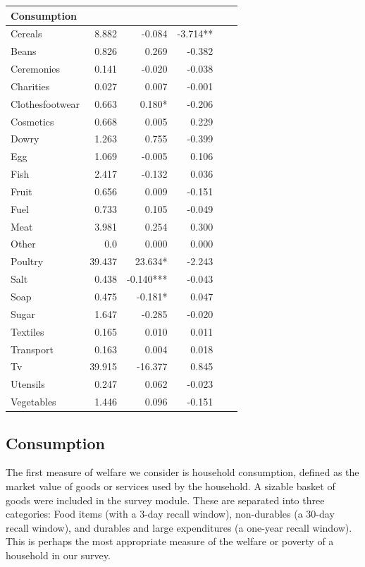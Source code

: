 \documentclass[12pt,article]{article}
\begin{document}
\begin{longtable}{lrrrrr}
\hline
Consumption &  &  & \\
\hline
Cereals & 8.882 & -0.084 & -3.714**\\
Beans & 0.826 & 0.269 & -0.382\\
Ceremonies & 0.141 & -0.020 & -0.038\\
Charities & 0.027 & 0.007 & -0.001\\
Clothesfootwear & 0.663 & 0.180* & -0.206\\
Cosmetics & 0.668 & 0.005 & 0.229\\
Dowry & 1.263 & 0.755 & -0.399\\
Egg & 1.069 & -0.005 & 0.106\\
Fish & 2.417 & -0.132 & 0.036\\
Fruit & 0.656 & 0.009 & -0.151\\
Fuel & 0.733 & 0.105 & -0.049\\
Meat & 3.981 & 0.254 & 0.300\\
Other & 0.0 & 0.000 & 0.000\\
Poultry & 39.437 & 23.634* & -2.243\\
Salt & 0.438 & -0.140*** & -0.043\\
Soap & 0.475 & -0.181* & 0.047\\
Sugar & 1.647 & -0.285 & -0.020\\
Textiles & 0.165 & 0.010 & 0.011\\
Transport & 0.163 & 0.004 & 0.018\\
Tv & 39.915 & -16.377 & 0.845\\
Utensils & 0.247 & 0.062 & -0.023\\
Vegetables & 1.446 & 0.096 & -0.151\\
\hline
\end{longtable}

\subsection*{Consumption}
\label{sec-3-3}

The first measure of welfare we consider is household consumption, defined as the
market value of goods or services used by the household. A sizable basket of goods
were included in the survey module. These are separated into three categories: Food
items (with a 3-day recall window), non-durables (a 30-day recall window), and
durables and large expenditures (a one-year recall window). This is perhaps the most
appropriate measure of the welfare or poverty of a household in our survey. 
\end{document}
